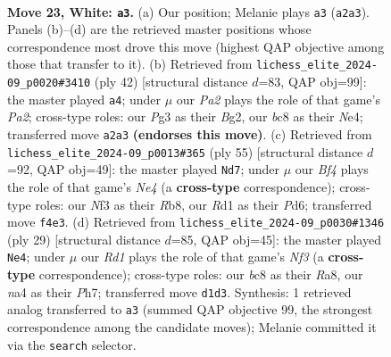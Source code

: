 \documentclass[11pt]{article}
\begin{document}
\clearpage

\begin{figure}[p]\centering
\begin{subfigure}{0.46\textwidth}\centering
\resizebox{\linewidth}{!}{%
\newchessgame
\chessboard[
  setfen={r1b4r/5k2/ppn1p1p1/4Pp1p/nbB2B2/1N3NP1/PP3P1P/RK1R4 w - - 0 23},
  showmover=false,
  pgfstyle=straightmove, color=movearrow, markmove={a2-a3}
]}
\caption{}
\end{subfigure}\hfill
\begin{subfigure}{0.46\textwidth}\centering
\resizebox{\linewidth}{!}{%
\newchessgame
\chessboard[
  setfen={r1b2rk1/pp3pp1/1bp4p/4P3/4NBn1/6P1/PP3PBP/R2R2K1 w - - 0 22},
  showmover=false,
  pgfstyle=straightmove, color=movearrow, markmove={a2-a4}
]}
\caption{}
\end{subfigure}
\\[4pt]
\begin{subfigure}{0.46\textwidth}\centering
\resizebox{\linewidth}{!}{%
\newchessgame
\chessboard[
  setfen={rr4k1/5pb1/3p2pp/1npPn3/p3P3/4P1PP/RPN2PK1/1R2BB2 b - - 3 28},
  showmover=false,
  pgfstyle=straightmove, color=movearrow, markmove={e5-d7}
]}
\caption{}
\end{subfigure}\hfill
\begin{subfigure}{0.46\textwidth}\centering
\resizebox{\linewidth}{!}{%
\newchessgame
\chessboard[
  setfen={r1r3k1/1p3ppp/p1nBpn2/2Pp1b2/3P4/4PNP1/1P3P1P/R3KB1R b KQ - 0 15},
  showmover=false,
  pgfstyle=straightmove, color=movearrow, markmove={f6-e4}
]}
\caption{}
\end{subfigure}
\caption{\textbf{Move 23, White: \texttt{a3}.} (a) Our position; Melanie plays \texttt{a3} (\texttt{a2a3}). Panels (b)--(d) are the retrieved master positions whose correspondence most drove this move (highest QAP objective among those that transfer to it). (b) Retrieved from \texttt{lichess\_elite\_2024-09\_p0020\#3410} (ply 42) [structural distance $d$=83, QAP obj=99]: the master played \texttt{a4}; under $\mu$ our \emph{Pa2} plays the role of that game's \emph{Pa2}; cross-type roles: our \emph{P}g3 as their \emph{B}g2, our \emph{b}c8 as their \emph{N}e4; transferred move \texttt{a2a3} \textbf{(endorses this move)}. (c) Retrieved from \texttt{lichess\_elite\_2024-09\_p0013\#365} (ply 55) [structural distance $d$=92, QAP obj=49]: the master played \texttt{Nd7}; under $\mu$ our \emph{Bf4} plays the role of that game's \emph{Ne4} (a \textbf{cross-type} correspondence); cross-type roles: our \emph{N}f3 as their \emph{R}b8, our \emph{R}d1 as their \emph{P}d6; transferred move \texttt{f4e3}. (d) Retrieved from \texttt{lichess\_elite\_2024-09\_p0030\#1346} (ply 29) [structural distance $d$=85, QAP obj=45]: the master played \texttt{Ne4}; under $\mu$ our \emph{Rd1} plays the role of that game's \emph{Nf3} (a \textbf{cross-type} correspondence); cross-type roles: our \emph{b}c8 as their \emph{R}a8, our \emph{n}a4 as their \emph{P}h7; transferred move \texttt{d1d3}. Synthesis: 1 retrieved analog transferred to \texttt{a3} (summed QAP objective 99, the strongest correspondence among the candidate moves); Melanie committed it via the \texttt{search} selector.}
\label{fig:thought-m44}
\end{figure}
\end{document}
